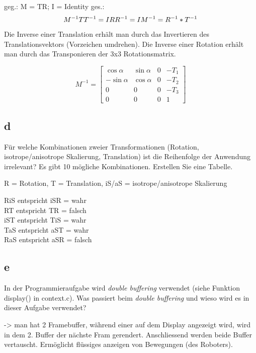 \documentclass[12pt]{scrreprt}
\begin{document}
geg.: M = TR; I = Identity
ges.: \[M^{-1} \\
 \\
TT^{-1} = I \\
RR^{-1} = I \\
M^{-1} = R^{-1} * T^{-1}
\]

Die Inverse einer Translation erhält man durch das Invertieren des Translationsvektors (Vorzeichen umdrehen).
Die Inverse einer Rotation erhält man durch das Transponieren der 3x3 Rotationsmatrix.

\[
 M^{-1} = \begin{bmatrix}
       \cos \alpha & \sin\alpha & 0 & -T_1 \\[0.3em]
       -\sin\alpha & \cos\alpha & 0 & -T_2 \\[0.3em]
       0           & 0          & 0 & -T_3 \\[0.3em]
       0           & 0          & 0 & 1
     \end{bmatrix}
\]

\subsection*{d}

Für welche Kombinationen zweier Transformationen (Rotation, isotrope/anisotrope Skalierung,
Translation) ist die Reihenfolge der Anwendung irrelevant? Es gibt 10 mögliche Kombinationen. Erstellen
Sie eine Tabelle.

R = Rotation, T = Translation,  iS/aS = isotrope/anisotrope Skalierung

RiS entspricht iSR = wahr\\
RT entspricht TR   = falsch\\
iST entspricht TiS = wahr\\
TaS entspricht aST = wahr\\
RaS entspricht aSR = falsch\\

\subsection*{e}

In der Programmieraufgabe wird \emph{double buffering} verwendet (siehe Funktion display() in
context.c). Was passiert beim \emph{double buffering} und wieso wird es in dieser Aufgabe verwendet?

-> man hat 2 Framebuffer, während einer auf dem Display angezeigt wird, wird in dem 2. Buffer der nächste Fram gerendert. Anschliessend werden beide Buffer vertauscht. Ermöglicht flüssiges anzeigen von Bewegungen (des Roboters).
\end{document}
